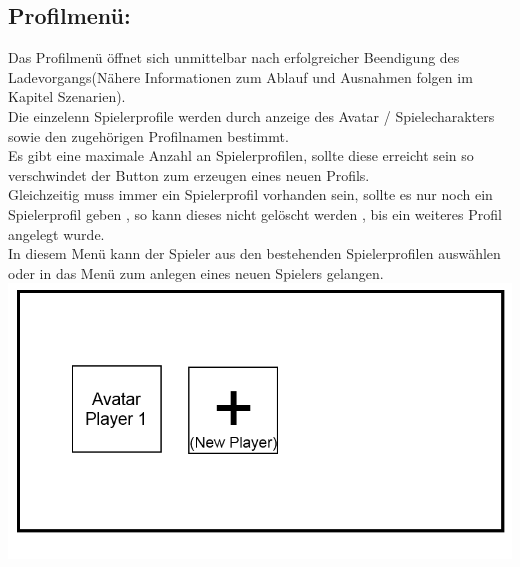 \documentclass{scrartcl}
\begin{document}
\begin{enumerate}
\begin{minipage}{1\textwidth}
		\item \subsection*{Profilmenü:}
		Das Profilmenü öffnet sich unmittelbar nach erfolgreicher Beendigung des Ladevorgangs(Nähere Informationen zum Ablauf und Ausnahmen folgen im Kapitel Szenarien).\\
		Die einzelenn Spielerprofile werden durch anzeige des Avatar / Spielecharakters sowie den zugehörigen Profilnamen bestimmt.\\
		Es gibt eine maximale Anzahl an Spielerprofilen, sollte diese erreicht sein so verschwindet der Button zum erzeugen eines neuen Profils.\\
		Gleichzeitig muss immer ein Spielerprofil vorhanden sein, sollte es nur noch ein Spielerprofil geben , so kann dieses nicht gelöscht werden , bis ein weiteres Profil angelegt wurde.\\
		In diesem Menü kann der Spieler aus den bestehenden Spielerprofilen auswählen oder in das Menü zum anlegen eines neuen Spielers gelangen.\\
		\includegraphics[width=\textwidth]{assets/PlayerScreen}
	\end{minipage}
	

\end{enumerate}
\end{document}
